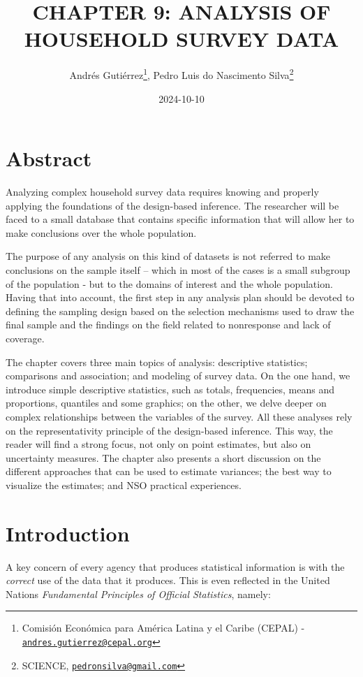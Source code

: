 \documentclass[
  12pt,
]{book}
\title{CHAPTER 9: ANALYSIS OF HOUSEHOLD SURVEY DATA}
\author{Andrés Gutiérrez\footnote{Comisión Económica para América Latina y el Caribe (CEPAL) - \href{mailto:andres.gutierrez@cepal.org}{\nolinkurl{andres.gutierrez@cepal.org}}}, Pedro Luis do Nascimento Silva\footnote{SCIENCE, \href{mailto:pedronsilva@gmail.com}{\nolinkurl{pedronsilva@gmail.com}}}}
\date{2024-10-10}
\begin{document}
\maketitle

{
\hypersetup{linkcolor=}
\setcounter{tocdepth}{0}
\tableofcontents
}
\listoffigures
\listoftables
\hypertarget{abstract}{%
\chapter*{Abstract}\label{abstract}}

Analyzing complex household survey data requires knowing and properly applying the foundations of the design-based inference. The researcher will be faced to a small database that contains specific information that will allow her to make conclusions over the whole population.

The purpose of any analysis on this kind of datasets is not referred to make conclusions on the sample itself -- which in most of the cases is a small subgroup of the population - but to the domains of interest and the whole population. Having that into account, the first step in any analysis plan should be devoted to defining the sampling design based on the selection mechanisms used to draw the final sample and the findings on the field related to nonresponse and lack of coverage.

The chapter covers three main topics of analysis: descriptive statistics; comparisons and association; and modeling of survey data. On the one hand, we introduce simple descriptive statistics, such as totals, frequencies, means and proportions, quantiles and some graphics; on the other, we delve deeper on complex relationships between the variables of the survey. All these analyses rely on the representativity principle of the design-based inference. This way, the reader will find a strong focus, not only on point estimates, but also on uncertainty measures. The chapter also presents a short discussion on the different approaches that can be used to estimate variances; the best way to visualize the estimates; and NSO practical experiences.

\hypertarget{introduction}{%
\chapter*{Introduction}\label{introduction}}

A key concern of every agency that produces statistical information is with the \emph{correct} use of the data that it produces. This is even reflected in the United Nations \emph{Fundamental Principles of Official Statistics}, namely:
\end{document}
